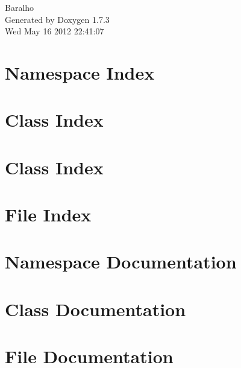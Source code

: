 \documentclass[a4paper]{book}
\begin{document}
\hypersetup{pageanchor=false}
\begin{titlepage}
\vspace*{7cm}
\begin{center}
{\Large Baralho }\\
\vspace*{1cm}
{\large Generated by Doxygen 1.7.3}\\
\vspace*{0.5cm}
{\small Wed May 16 2012 22:41:07}\\
\end{center}
\end{titlepage}
\clearemptydoublepage
{}
\tableofcontents
\clearemptydoublepage
{}
\hypersetup{pageanchor=true}
\chapter{Namespace Index}

\chapter{Class Index}

\chapter{Class Index}

\chapter{File Index}

\chapter{Namespace Documentation}


\chapter{Class Documentation}










\chapter{File Documentation}











\printindex
\end{document}

